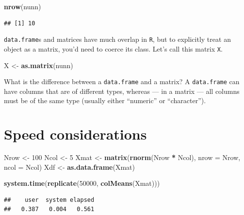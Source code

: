 \documentclass[]{book}
\newenvironment{Shaded}{\begin{snugshade}}{\end{snugshade}}
\newcommand{\KeywordTok}[1]{\textcolor[rgb]{0.13,0.29,0.53}{\textbf{#1}}}
\newcommand{\DataTypeTok}[1]{\textcolor[rgb]{0.13,0.29,0.53}{#1}}
\newcommand{\DecValTok}[1]{\textcolor[rgb]{0.00,0.00,0.81}{#1}}
\newcommand{\StringTok}[1]{\textcolor[rgb]{0.31,0.60,0.02}{#1}}
\newcommand{\OperatorTok}[1]{\textcolor[rgb]{0.81,0.36,0.00}{\textbf{#1}}}
\newcommand{\NormalTok}[1]{#1}
\theoremstyle{definition}
\theoremstyle{definition}
\theoremstyle{definition}
\theoremstyle{remark}
\begin{document}
\begin{Shaded}
\begin{Highlighting}[]
\KeywordTok{nrow}\NormalTok{(nunn)}
\end{Highlighting}
\end{Shaded}

\begin{verbatim}
## [1] 10
\end{verbatim}

\texttt{data.frame}s and matrices have much overlap in \texttt{R}, but
to explicitly treat an object as a matrix, you'd need to coerce its
class. Let's call this matrix \texttt{X}.

\begin{Shaded}
\begin{Highlighting}[]
\NormalTok{X <-}\StringTok{ }\KeywordTok{as.matrix}\NormalTok{(nunn)}
\end{Highlighting}
\end{Shaded}

What is the difference between a \texttt{data.frame} and a matrix? A
\texttt{data.frame} can have columns that are of different types,
whereas --- in a matrix --- all columns must be of the same type
(usually either ``numeric'' or ``character'').

\section{Speed considerations}\label{speed-considerations}

\begin{Shaded}
\begin{Highlighting}[]
\NormalTok{Nrow <-}\StringTok{ }\DecValTok{100}
\NormalTok{Ncol  <-}\StringTok{ }\DecValTok{5}
\NormalTok{Xmat <-}\StringTok{ }\KeywordTok{matrix}\NormalTok{(}\KeywordTok{rnorm}\NormalTok{(Nrow }\OperatorTok{*}\StringTok{ }\NormalTok{Ncol), }\DataTypeTok{nrow =}\NormalTok{ Nrow, }\DataTypeTok{ncol =}\NormalTok{ Ncol)}
\NormalTok{Xdf <-}\StringTok{ }\KeywordTok{as.data.frame}\NormalTok{(Xmat)}

\KeywordTok{system.time}\NormalTok{(}\KeywordTok{replicate}\NormalTok{(}\DecValTok{50000}\NormalTok{, }\KeywordTok{colMeans}\NormalTok{(Xmat)))}
\end{Highlighting}
\end{Shaded}

\begin{verbatim}
##    user  system elapsed 
##   0.387   0.004   0.561
\end{verbatim}
\end{document}
